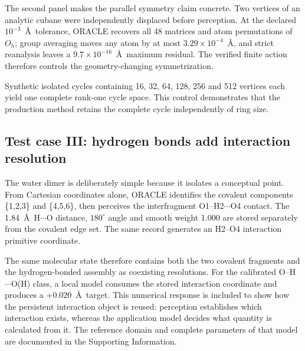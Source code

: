 \documentclass[journal=jctcce,manuscript=article]{achemso}
\begin{document}
The second panel makes the parallel symmetry claim concrete.  Two vertices of
an analytic cubane were independently displaced before perception.  At the
declared $10^{-3}$~\AA\ tolerance, ORACLE recovers all 48 matrices and atom
permutations of $O_h$; group averaging moves any atom by at most
$3.29\times10^{-4}$~\AA, and strict reanalysis leaves a
$9.7\times10^{-16}$~\AA\ maximum residual.  The verified finite action
therefore controls the geometry-changing symmetrization.

Synthetic isolated cycles containing 16, 32, 64, 128, 256 and 512 vertices
each yield one complete rank-one cycle space.  This control demonstrates that
the production method retains the complete cycle independently of ring size.

\subsection{Test case III: hydrogen bonds add interaction resolution}

The water dimer is deliberately simple because it isolates a conceptual point.
From Cartesian coordinates alone, ORACLE identifies the covalent components
\{1,2,3\} and \{4,5,6\}, then perceives the interfragment
O1--H2$\cdots$O4 contact.  The 1.84~\AA\ H$\cdots$O distance,
$180^\circ$ angle and smooth weight 1.000 are stored separately from the
covalent edge set.  The same record generates an H2--O4 interaction primitive
coordinate.

The same molecular state therefore contains both the two covalent fragments
and the hydrogen-bonded assembly as coexisting resolutions.  For the calibrated
O--H$\cdots$O(H) class, a local model consumes the stored interaction
coordinate and produces a $+0.020$~\AA\ target.  This numerical response is
included to show how the persistent interaction object is reused: perception
establishes which interaction exists, whereas the application model decides
what quantity is calculated from it.  The reference domain and complete
parameters of that model are documented in the Supporting Information.
\end{document}
